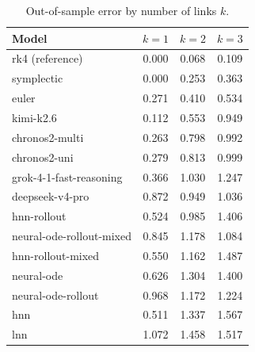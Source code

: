 \documentclass{article}
\begin{document}
\begin{table}[tbp]
\centering\small
\caption{Out-of-sample error by number of links $k$.}
\label{tab:perk}
\begin{tabular}{lccc}
\toprule
Model & $k{=}1$ & $k{=}2$ & $k{=}3$ \\
\midrule
rk4 (reference) & 0.000 & 0.068 & 0.109 \\
symplectic & 0.000 & 0.253 & 0.363 \\
euler & 0.271 & 0.410 & 0.534 \\
kimi-k2.6 & 0.112 & 0.553 & 0.949 \\
chronos2-multi & 0.263 & 0.798 & 0.992 \\
chronos2-uni & 0.279 & 0.813 & 0.999 \\
grok-4-1-fast-reasoning & 0.366 & 1.030 & 1.247 \\
deepseek-v4-pro & 0.872 & 0.949 & 1.036 \\
hnn-rollout & 0.524 & 0.985 & 1.406 \\
neural-ode-rollout-mixed & 0.845 & 1.178 & 1.084 \\
hnn-rollout-mixed & 0.550 & 1.162 & 1.487 \\
neural-ode & 0.626 & 1.304 & 1.400 \\
neural-ode-rollout & 0.968 & 1.172 & 1.224 \\
hnn & 0.511 & 1.337 & 1.567 \\
lnn & 1.072 & 1.458 & 1.517 \\
\bottomrule
\end{tabular}
\end{table}
\end{document}
